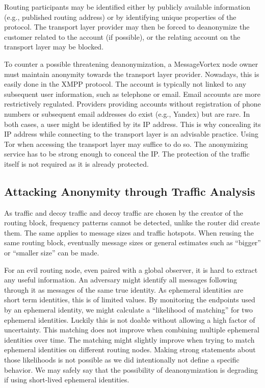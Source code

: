 Routing participants may be identified either by publicly available information (e.g., published routing address) or by identifying unique properties of the protocol. The transport layer provider may then be forced to deanonymize the customer related to the account (if possible), or the relating account on the transport layer may be blocked. 

To counter a possible threatening deanonymization, a MessageVortex node owner must maintain anonymity towards the transport layer provider. Nowadays, this is easily done in the XMPP protocol. The account is typically not linked to any subsequent user information, such as telephone or email. Email accounts are more restrictively regulated. Providers providing accounts without registration of phone numbers or subsequent email addresses do exist (e.g., Yandex) but are rare. In both cases, a user might be identified by its IP address. This is why concealing its IP address while connecting to the transport layer is an advisable practice. Using Tor when accessing the transport layer may suffice to do so. The anonymizing service has to be strong enough to conceal the IP. The protection of the traffic itself is not required as it is already protected.

\subsection{Attacking Anonymity through Traffic Analysis}
As traffic and decoy traffic and decoy traffic are chosen by the creator of the routing block, frequency patterns cannot be detected, unlike the router did create them. The same applies to message sizes and traffic hotspots. When reusing the same routing block, eventually message sizes or general estimates such as ``bigger'' or ``smaller size'' can be made.

For an evil routing node, even paired with a global observer, it is hard to extract any useful information. An adversary might identify all messages following through it as messages of the same true identity. As ephemeral identities are short term identities, this is of limited values. By monitoring the endpoints used by an ephemeral identity, we might calculate a ``likelihood of matching'' for two ephemeral identities. Luckily this is not doable without allowing a high factor of uncertainty. This matching does not improve when combining multiple ephemeral identities over time. The matching might slightly improve when trying to match ephemeral identities on different routing nodes. Making strong statements about those likelihoods is not possible as we did intentionally not define a specific behavior. We may safely say that the possibility of deanonymization is degrading if using short-lived ephemeral identities.

